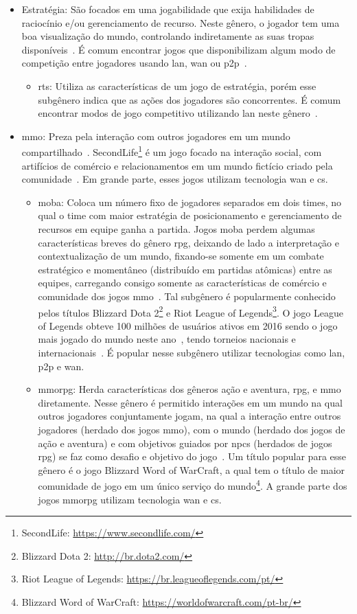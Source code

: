 \begin{itemize}
  \item Estratégia: São focados em uma jogabilidade que exija habilidades de raciocínio e/ou gerenciamento de recurso. Neste gênero, o jogador tem uma boa visualização do mundo, controlando indiretamente as suas tropas disponíveis~\cite{rollings2003andrew}. É comum encontrar jogos que disponibilizam algum modo de competição entre jogadores usando \ac{lan}, \ac{wan} ou \ac{p2p}~\cite{adams_1208533}.
    \begin{itemize}
      \item \ac{rts}: Utiliza as características de um jogo de estratégia, porém esse subgênero indica que as ações dos jogadores são concorrentes. É comum encontrar modos de jogo competitivo utilizando \ac{lan} neste gênero~\cite{adams_1208533}.
    \end{itemize}
  \item \ac{mmo}: Preza pela interação com outros jogadores em um mundo compartilhado~\cite{adams_1208533}. SecondLife\footnote{SecondLife: \url{https://www.secondlife.com/}} é um jogo focado na interação social, com artifícios de comércio e relacionamentos em um mundo fictício criado pela comunidade~\cite{tecmundo_secondlife}. Em grande parte, esses jogos utilizam tecnologia \ac{wan} e \ac{cs}.
    \begin{itemize}
      \item \ac{moba}: Coloca um número fixo de jogadores separados em dois times, no qual o time com maior estratégia de posicionamento e gerenciamento de recursos em equipe ganha a partida. Jogos \ac{moba} perdem algumas características breves do gênero \ac{rpg}, deixando de lado a interpretação e contextualização de um mundo, fixando-se somente em um combate estratégico e momentâneo (distribuído em partidas atômicas) entre as equipes, carregando consigo somente as características de comércio e comunidade dos jogos \ac{mmo}~\cite{adams_1208533}. Tal subgênero é popularmente conhecido pelos títulos Blizzard Dota 2\footnote{Blizzard Dota 2: \url{http://br.dota2.com/}} e Riot League of Legends\footnote{Riot League of Legends: \url{https://br.leagueoflegends.com/pt/}}. O jogo League of Legends obteve 100 milhões de usuários ativos em 2016 sendo o jogo mais jogado do mundo neste ano~\cite{lol_statista}, tendo torneios nacionais e internacionais~\cite{lol_sportv}. É popular nesse subgênero utilizar tecnologias como \ac{lan}, \ac{p2p} e \ac{wan}.
      \item \ac{mmorpg}: Herda características dos gêneros ação e aventura, \ac{rpg}, e \ac{mmo} diretamente. Nesse gênero é permitido interações em um mundo na qual outros jogadores conjuntamente jogam, na qual a interação entre outros jogadores (herdado dos jogos \ac{mmo}), com o mundo (herdado dos jogos de ação e aventura) e com objetivos guiados por \acp{npc} (herdados de jogos \ac{rpg}) se faz como desafio e objetivo do jogo~\cite{adams_1208533}. Um título popular para esse gênero é o jogo Blizzard Word of WarCraft, a qual tem o título de maior comunidade de jogo em um único serviço do mundo\footnote{Blizzard Word of WarCraft: \url{https://worldofwarcraft.com/pt-br/}}. A grande parte dos jogos \ac{mmorpg} utilizam tecnologia \ac{wan} e \ac{cs}.

\end{itemize}
\end{itemize}

